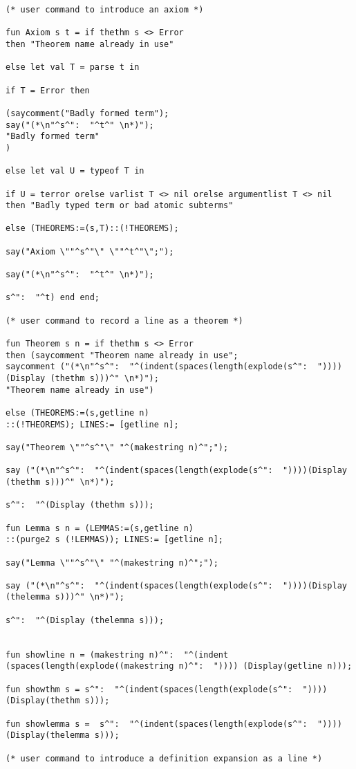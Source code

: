 \documentclass{article}
\begin{document}
{{\begin {verbatim}
(* user command to introduce an axiom *)

fun Axiom s t = if thethm s <> Error 
then "Theorem name already in use"

else let val T = parse t in

if T = Error then 

(saycomment("Badly formed term");
say("(*\n"^s^":  "^t^" \n*)");
"Badly formed term"
)

else let val U = typeof T in 

if U = terror orelse varlist T <> nil orelse argumentlist T <> nil 
then "Badly typed term or bad atomic subterms"

else (THEOREMS:=(s,T)::(!THEOREMS);

say("Axiom \""^s^"\" \""^t^"\";");

say("(*\n"^s^":  "^t^" \n*)");

s^":  "^t) end end;

(* user command to record a line as a theorem *)

fun Theorem s n = if thethm s <> Error 
then (saycomment "Theorem name already in use";
saycomment ("(*\n"^s^":  "^(indent(spaces(length(explode(s^":  "))))(Display (thethm s)))^" \n*)");
"Theorem name already in use")

else (THEOREMS:=(s,getline n)
::(!THEOREMS); LINES:= [getline n];

say("Theorem \""^s^"\" "^(makestring n)^";");

say ("(*\n"^s^":  "^(indent(spaces(length(explode(s^":  "))))(Display (thethm s)))^" \n*)");

s^":  "^(Display (thethm s)));

fun Lemma s n = (LEMMAS:=(s,getline n)
::(purge2 s (!LEMMAS)); LINES:= [getline n];

say("Lemma \""^s^"\" "^(makestring n)^";");

say ("(*\n"^s^":  "^(indent(spaces(length(explode(s^":  "))))(Display (thelemma s)))^" \n*)");

s^":  "^(Display (thelemma s)));


fun showline n = (makestring n)^":  "^(indent (spaces(length(explode((makestring n)^":  ")))) (Display(getline n)));

fun showthm s = s^":  "^(indent(spaces(length(explode(s^":  "))))(Display(thethm s)));

fun showlemma s =  s^":  "^(indent(spaces(length(explode(s^":  "))))(Display(thelemma s)));

(* user command to introduce a definition expansion as a line *)


\end{verbatim}}}
\end{document}
